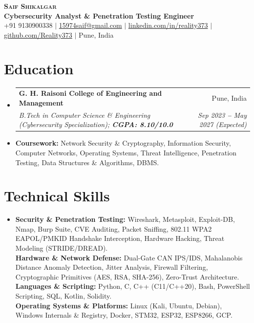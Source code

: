\documentclass[letterpaper,9pt]{extarticle}
\makeatletter
\newcommand{\resumeSubheading}[4]{
  \vspace{-2pt}\item
    \begin{tabular*}{\linewidth}[t]{l@{\extracolsep{\fill}}r}
      \textbf{#1} & #2 \\
      \textit{\small#3} & \textit{\small #4} \\
    \end{tabular*}\vspace{-5pt}
}
\newcommand{\resumeSubHeadingListStart}{\begin{itemize}[leftmargin=0.08in, label={}]}
\newcommand{\resumeSubHeadingListEnd}{\end{itemize}\vspace{-5pt}}
\makeatother
\begin{document}
\begin{center}
    \textbf{\LARGE \scshape Saif Shikalgar} \\ \vspace{2pt}
    \small
    \textbf{Cybersecurity Analyst \& Penetration Testing Engineer} \\ \vspace{1.5pt}
    +91 9130900338
    $|$
    \href{mailto:15974saif@gmail.com}{15974saif@gmail.com}
    $|$
    \href{https://www.linkedin.com/in/reality373}{linkedin.com/in/reality373}
    $|$
    \href{https://github.com/Reality373}{github.com/Reality373}
    $|$
    Pune, India
\end{center}
\vspace{-6pt}

\section{Education}
  \vspace{1pt}
  \resumeSubHeadingListStart
    \resumeSubheading
      {G. H. Raisoni College of Engineering and Management}{Pune, India}
      {B.Tech in Computer Science \& Engineering (Cybersecurity Specialization); \textbf{CGPA: 8.10/10.0}}{Sep 2023 \textbf{--} May 2027 (Expected)}
      \vspace{-2pt}
      \item{
        \small{\textbf{Coursework:} Network Security \& Cryptography, Information Security, Computer Networks, Operating Systems, Threat Intelligence, Penetration Testing, Data Structures \& Algorithms, DBMS.}
      }
  \resumeSubHeadingListEnd

\section{Technical Skills}
  \vspace{1pt}
  \resumeSubHeadingListStart
    \item{
        \small{\textbf{Security \& Penetration Testing:}{ Wireshark, Metasploit, Exploit-DB, Nmap, Burp Suite, CVE Auditing, Packet Sniffing, 802.11 WPA2 EAPOL/PMKID Handshake Interception, Hardware Hacking, Threat Modeling (STRIDE/DREAD).}} \\ \vspace{1.5pt}
        \small{\textbf{Hardware \& Network Defense:}{ Dual-Gate CAN IPS/IDS, Mahalanobis Distance Anomaly Detection, Jitter Analysis, Firewall Filtering, Cryptographic Primitives (AES, RSA, SHA-256), Zero-Trust Architecture.}} \\ \vspace{1.5pt}
        \small{\textbf{Languages \& Scripting:}{ Python, C, C++ (C11/C++20), Bash, PowerShell Scripting, SQL, Kotlin, Solidity.}} \\ \vspace{1.5pt}
        \small{\textbf{Operating Systems \& Platforms:}{ Linux (Kali, Ubuntu, Debian), Windows Internals \& Registry, Docker, STM32, ESP32, ESP8266, GCP.}}
    }
  \resumeSubHeadingListEnd
\end{document}
